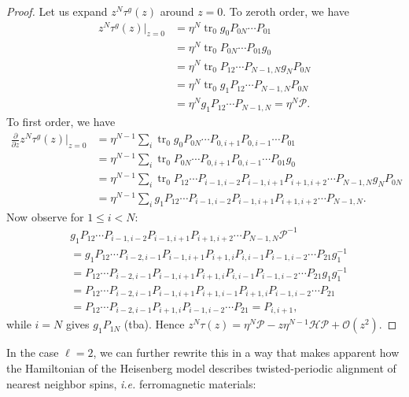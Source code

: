 \documentclass[11pt]{report}
\theoremstyle{definition}
\theoremstyle{remark}
\theoremstyle{remark}
\begin{document}
\begin{proof}
Let us expand $z^N \tau^g(z)$ around $z = 0$. To zeroth order, we have
\begin{align*}
z^N \tau^g(z)|_{z=0}
&= \eta^N \operatorname{tr}_0 g_0 P_{0N} \cdots P_{01} \\
&= \eta^N \operatorname{tr}_0 P_{0N} \cdots P_{01} g_0 \\
&= \eta^N \operatorname{tr}_0 P_{12} \cdots P_{N-1,N} g_N P_{0N} \\
&= \eta^N \operatorname{tr}_0 g_1 P_{12} \cdots P_{N-1,N} P_{0N} \\
&= \eta^N g_1 P_{12} \cdots P_{N-1,N} = \eta^N \mathcal{P}.
\end{align*}
To first order, we have
\begin{align*}
\frac{\partial}{\partial z} z^N \tau^g(z)|_{z=0}
&= \eta^{N-1} \sum_i \operatorname{tr}_0 g_0 P_{0N} \cdots P_{0,i+1} P_{0,i-1} \cdots P_{01} \\
&= \eta^{N-1} \sum_i \operatorname{tr}_0 P_{0N} \cdots P_{0,i+1} P_{0,i-1} \cdots P_{01} g_0 \\
&= \eta^{N-1} \sum_i \operatorname{tr}_0 P_{12} \cdots P_{i-1,i-2} P_{i-1,i+1} P_{i+1,i+2} \cdots P_{N-1,N} g_N P_{0N} \\
&= \eta^{N-1} \sum_i g_1 P_{12} \cdots P_{i-1,i-2} P_{i-1,i+1} P_{i+1,i+2} \cdots P_{N-1,N}.
\end{align*}
Now observe for $1 \leq i < N$:
\begin{align*}
& g_1 P_{12} \cdots P_{i-1,i-2} P_{i-1,i+1} P_{i+1,i+2} \cdots P_{N-1,N} \mathcal{P}^{-1} \\
&= g_1 P_{12} \cdots P_{i-2,i-1} P_{i-1,i+1} P_{i+1,i} P_{i,i-1} P_{i-1,i-2} \cdots P_{21} g_1^{-1} \\
&= P_{12} \cdots P_{i-2,i-1} P_{i-1,i+1} P_{i+1,i} P_{i,i-1} P_{i-1,i-2} \cdots P_{21} g_1 g_1^{-1} \\
&= P_{12} \cdots P_{i-2,i-1} P_{i-1,i+1} P_{i+1,i-1} P_{i+1,i} P_{i-1,i-2} \cdots P_{21} \\
&= P_{12} \cdots P_{i-2,i-1} P_{i+1,i} P_{i-1,i-2} \cdots P_{21} = P_{i,i+1},
\end{align*}
while $i=N$ gives $g_1 P_{1N}$ (tba). Hence $z^N \tau(z) = \eta^N \mathcal{P} - z \eta^{N-1} \mathcal{H} \mathcal{P} + \mathcal{O}(z^2)$.
\end{proof}

In the case $\ell=2$, we can further rewrite this in a way that makes apparent how the Hamiltonian of the Heisenberg model describes twisted-periodic alignment of nearest neighbor spins, \emph{i.e.} ferromagnetic materials:
\end{document}
